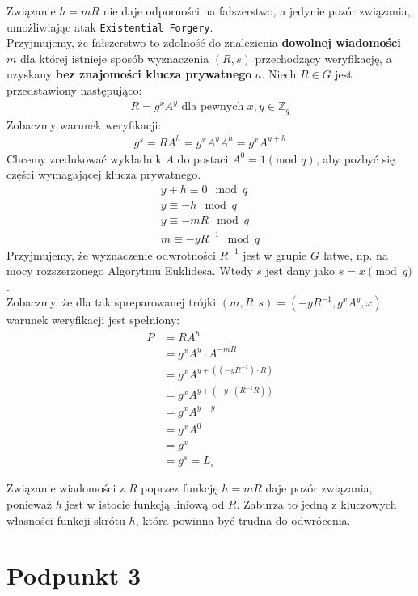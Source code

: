 \documentclass{article}
\numberwithin{equation}{subsection}
\begin{document}
Związanie $h=mR$ nie daje odporności na fałszerstwo, a jedynie pozór związania, umożliwiając atak \texttt{Existential Forgery}.\\

\noindent
Przyjmujemy, że fałszerstwo to zdolność do znalezienia \textbf{dowolnej wiadomości} $m$
dla której istnieje sposób wyznaczenia $(R,s)$ przechodzący weryfikację, 
a uzyskany \textbf{bez znajomości klucza prywatnego} $a$.
Niech $R\in G$ jest przedstawiony następująco: 
\begin{align*}
    R=g^x A^y \text{ dla pewnych } x,y \in \mathbb{Z}_q
\end{align*}
Zobaczmy warunek weryfikacji:
\begin{align*}
    g^s = RA^h = g^x A^y A^h = g^x A^{y+h}
\end{align*}
Chcemy zredukować wykładnik $A$ do postaci $A^0=1 (\text{mod } q)$, aby pozbyć się części wymagającej klucza prywatnego.
\begin{align*}
    y+h \equiv 0 \mod q \\
    y \equiv -h \mod q \\
    y \equiv -mR \mod q \\
    m \equiv -yR^{-1} \mod q
\end{align*}
Przyjmujemy, że wyznaczenie odwrotności $R^{-1}$ jest w grupie $G$ łatwe, np. na mocy rozszerzonego Algorytmu Euklidesa.
Wtedy $s$ jest dany jako $s = x \pmod q$.\\

\noindent
Zobaczmy, że dla tak spreparowanej trójki $(m,R,s)=(-yR^{-1},g^xA^y,x)$ warunek weryfikacji jest spełniony:
\begin{align*}
    P &= RA^h  \\
      &= g^xA^y \cdot A^{-mR} \\
      &= g^x A^{y+((-yR^{-1})\cdot R)} \\
      &= g^x A^{y+(-y\cdot(R^{-1}R))} \\
      &= g^x A^{y-y} \\
      &= g^x A^0 \\
      &= g^x \\
      &= g^s = L_{\square}
\end{align*}

\noindent
Związanie wiadomości z $R$ poprzez funkcję $h=mR$ daje pozór związania, ponieważ $h$ jest w istocie funkcją liniową od $R$.
Zaburza to jedną z kluczowych własności funkcji skrótu $h$, która powinna być trudna do odwrócenia.

\section{Podpunkt 3}
\end{document}
